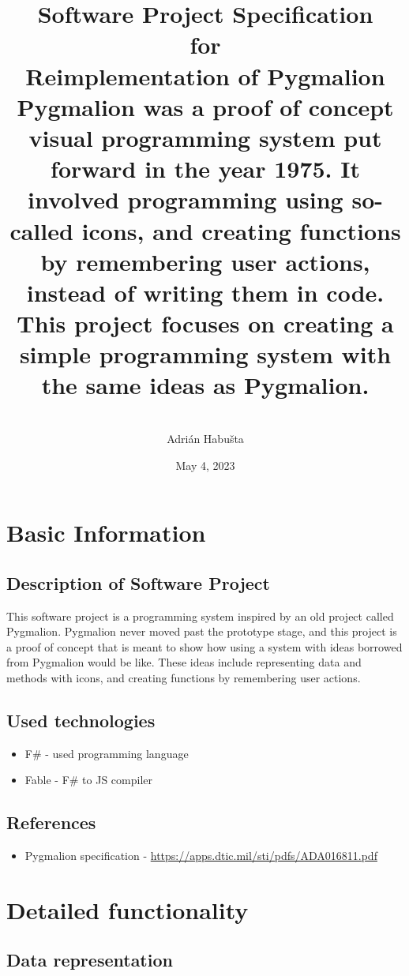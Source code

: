 \documentclass{article}
\author{%
    \vspace{3.5mm}\currentversion\\
    Adrián Habušta
    }
\title{%
    \LARGE Software Project Specification \\
    \Large for \\
    \Huge Reimplementation of Pygmalion \\\vspace{10mm}
    \normalsize Pygmalion was a proof of concept visual programming system
    put forward in the year 1975. It involved programming using so-called
    icons, and creating functions by remembering user actions, instead of
    writing them in code. This project focuses on creating a simple programming
    system with the same ideas as Pygmalion.
    }
\date{May 4, 2023}
\begin{document}
    \begin{titlepage}
        \maketitle
    \end{titlepage}

    \tableofcontents
    \newpage

    \section{Basic Information}
        \subsection{Description of Software Project}
            This software project is a programming system inspired by an old project called Pygmalion.
            Pygmalion never moved past the prototype stage, and this project is a proof of concept that is meant
            to show how using a system with ideas borrowed from Pygmalion would be like. These ideas include
            representing data and methods with icons, and creating functions by remembering user actions.

        \subsection{Used technologies}
            \begin{itemize}
                \item F\# - used programming language
                \item Fable - F\# to JS compiler
            \end{itemize}

        \subsection{References}
            \begin{itemize}
                \item Pygmalion specification
                    \subitem - \url{https://apps.dtic.mil/sti/pdfs/ADA016811.pdf}
            \end{itemize}


    \section{Detailed functionality}
        \subsection{Data representation}
\end{document}
